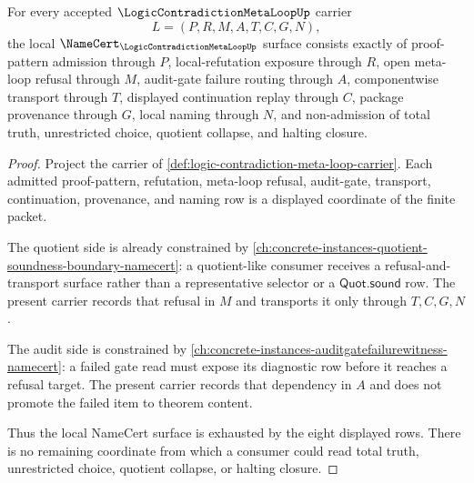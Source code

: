 \begin{theorem}
\label{thm:logic-contradiction-meta-loop-namecert-obligations}
For every accepted $\LogicContradictionMetaLoopUp$ carrier
$$
L=(P,R,M,A,T,C,G,N),
$$
the local $\NameCert_{\LogicContradictionMetaLoopUp}$ surface consists exactly of proof-pattern admission through $P$, local-refutation exposure through $R$, open meta-loop refusal through $M$, audit-gate failure routing through $A$, componentwise transport through $T$, displayed continuation replay through $C$, package provenance through $G$, local naming through $N$, and non-admission of total truth, unrestricted choice, quotient collapse, and halting closure.
\end{theorem}
\begin{proof}
Project the carrier of \autoref{def:logic-contradiction-meta-loop-carrier}. Each admitted proof-pattern, refutation, meta-loop refusal, audit-gate, transport, continuation, provenance, and naming row is a displayed coordinate of the finite packet.

The quotient side is already constrained by \autoref{ch:concrete-instances-quotient-soundness-boundary-namecert}: a quotient-like consumer receives a refusal-and-transport surface rather than a representative selector or a $\mathsf{Quot.sound}$ row. The present carrier records that refusal in $M$ and transports it only through $T,C,G,N$.

The audit side is constrained by \autoref{ch:concrete-instances-auditgatefailurewitness-namecert}: a failed gate read must expose its diagnostic row before it reaches a refusal target. The present carrier records that dependency in $A$ and does not promote the failed item to theorem content.

Thus the local NameCert surface is exhausted by the eight displayed rows. There is no remaining coordinate from which a consumer could read total truth, unrestricted choice, quotient collapse, or halting closure.
\end{proof}

